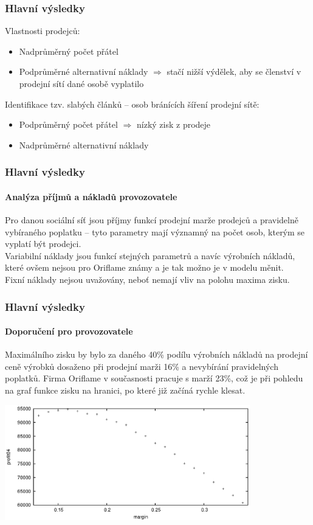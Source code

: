 \documentclass[xcolor=dvipsnames]{beamer}
\begin{document}
  \begin{frame}
    \frametitle{Hlavní výsledky}
    Vlastnosti prodejců:
    \begin{itemize}
      \item Nadprůměrný počet přátel
      \item Podprůměrné alternativní náklady $\Rightarrow$ stačí nižší výdělek, aby se členství v prodejní sítí dané osobě vyplatilo
    \end{itemize}
    Identifikace tzv. slabých článků -- osob bránících šíření prodejní sítě:
    \begin{itemize}
      \item Podprůměrný počet přátel $\Rightarrow$ nízký zisk z prodeje 
      \item Nadprůměrné alternativní náklady
    \end{itemize}
  \end{frame}
  \begin{frame}
    \frametitle{Hlavní výsledky}
    \framesubtitle{Analýza příjmů a nákladů provozovatele}
    Pro danou sociální síť jsou příjmy funkcí prodejní marže prodejců a pravidelně vybíraného poplatku -- tyto parametry mají významný na počet osob, kterým se vyplatí být prodejci.\\
    Variabilní náklady jsou funkcí stejných parametrů a navíc výrobních nákladů, které ovšem nejsou pro Oriflame známy a je tak možno je v modelu měnit.\\
    Fixní náklady nejsou uvažovány, neboť nemají vliv na polohu maxima zisku.\\
  \end{frame}
  \begin{frame}
    \frametitle{Hlavní výsledky}
    \framesubtitle{Doporučení pro provozovatele}
    Maximálního zisku by bylo za daného 40\% podílu výrobních nákladů na prodejní ceně výrobků dosaženo při prodejní marži 16\% a nevybírání pravidelných poplatků. Firma Oriflame v současnosti pracuje s marží 23\%, což je při pohledu na graf funkce zisku na hranici, po které již začíná rychle klesat.\\
    \begin{center}\includegraphics[width=0.8\textwidth]{max-profit-04-f0.eps}\end{center}
  \end{frame}
\end{document}
